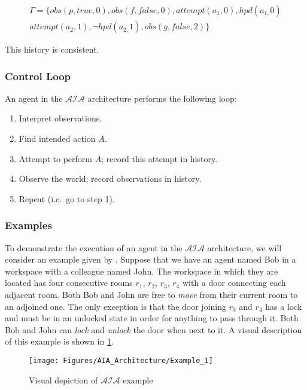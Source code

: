 \begin{multline}
    \Gamma=\{
        obs\left(p,true,0\right),obs\left(f,false,0\right),attempt(a_1, 0),hpd\left(a_{1,}0\right) \\
        attempt(a_2, 1), \neg hpd\left(a_{2,}1\right),obs\left(g,false,2\right)
    \}
\end{multline}

This history is consistent.

\subsubsection{Control Loop}
\label{subsubsec:control_loop}

An agent in the $\mathcal{AIA}$ architecture performs the following loop:

\begin{enumerate}
    \item Interpret observations.
    \item Find intended action $A$.
    \item Attempt to perform $A$;
        record this attempt in history.
    \item Observe the world;
        record observations in history.
    \item Repeat (i.e.~go to step 1).
\end{enumerate}

\subsubsection{Examples}
\label{subsubsec:aia_examples}

To demonstrate the execution of an agent in the $\mathcal{AIA}$ architecture, we will consider an example given by \citet{blount_architecture_2013}.
Suppose that we have an agent named Bob in a workspace with a colleague named John.
The workspace in which they are located has four consecutive rooms $r_1$, $r_2$, $r_3$, $r_4$ with a door connecting each adjacent room.
Both Bob and John are free to \textit{move} from their current room to an adjoined one.
The only exception is that the door joining $r_3$ and $r_4$ has a lock and must be in an unlocked state in order for anything to pass through it.
Both Bob and John can \textit{lock} and \textit{unlock} the door when next to it.
A visual description of this example is shown in \cref{fig:aia_example}.

\begin{figure}[h]
    \centering
    \texttt{[image: Figures/AIA\_Architecture/Example\_1]}
    \caption{Visual depiction of $\mathcal{AIA}$ example}
    \label{fig:aia_example}
\end{figure}

